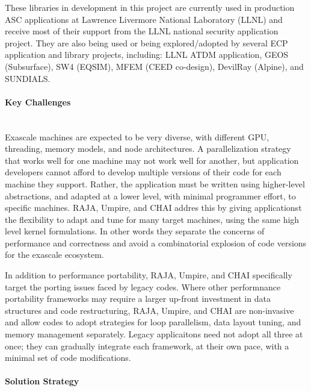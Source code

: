 These libraries in development in this project are currently used in
production ASC applications at Lawrence Livermore National Laboratory
(LLNL) and receive most of their support from the LLNL national security
application project. They are also being used or being explored/adopted
by several ECP application and library projects, including: LLNL ATDM
application, GEOS (Subsurface), SW4 (EQSIM), MFEM (CEED co-design),
DevilRay (Alpine), and SUNDIALS.


\paragraph{Key Challenges} \leavevmode \\

Exascale machines are expected to be very diverse, with different GPU,
threading, memory models, and node architectures.  A parallelization
strategy that works well for one machine may not work well for another,
but application developers cannot afford to develop multiple versions of
their code for each machine they support.  Rather, the application must
be written using higher-level abstractions, and adapted at a lower level,
with minimal programmer effort, to specific machines.  RAJA, Umpire, and
CHAI addres this by giving applicationst the flexibility to adapt and
tune for many target machines, using the same high level kernel
formulations.  In other words they separate the concerns of performance
and correctness and avoid a combinatorial explosion of code versions for
the exascale ecosystem.

In addition to performance portability, RAJA, Umpire, and CHAI
specifically target the porting issues faced by legacy codes.  Where
other performnance portability frameworks may require a larger up-front
investment in data structures and code restructuring, RAJA, Umpire, and
CHAI are non-invasive and allow codes to adopt strategies for loop
parallelism, data layout tuning, and memory management separately.
Legacy applicaitons need not adopt all three at once; they can gradually
integrate each framework, at their own pace, with a minimal set of code
modifications.

\paragraph{Solution Strategy} \leavevmode \\

